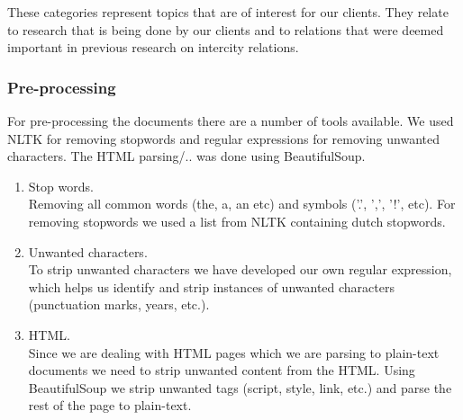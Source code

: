 These categories represent topics that are of interest for our clients. They relate to research that is being done by our clients and to relations that were deemed important in previous research on intercity relations.

\subsubsection{Pre-processing}

For pre-processing the documents there are a number of tools available. We used NLTK \cite{nlkt_stemming} for removing stopwords and regular expressions for removing unwanted characters. The HTML parsing/.. was done using BeautifulSoup.

\begin{enumerate}
\item Stop words. \\ 
Removing all common words (the, a, an etc) and symbols ('.', ',', '!', etc). For removing stopwords we used a list from NLTK containing dutch stopwords.

\item Unwanted characters. \\
To strip unwanted characters we have developed our own regular expression, which helps us identify and strip instances of unwanted characters (punctuation marks, years, etc.). 

\item HTML. \\
Since we are dealing with HTML pages which we are parsing to plain-text documents we need to strip unwanted content from the HTML. Using BeautifulSoup we strip unwanted tags (script, style, link, etc.) and parse the rest of the page to plain-text.
\end{enumerate}

